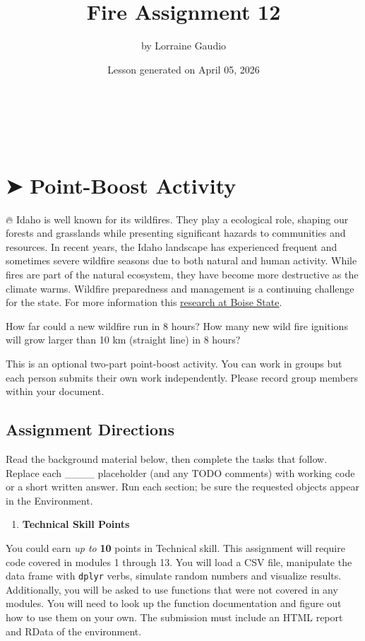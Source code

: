 \documentclass[
  12pt,
]{scrreprt}
\title{Fire Assignment 12}
\author{by Lorraine Gaudio}
\date{Lesson generated on April 05, 2026}
\providecommand{\tightlist}{%
  \setlength{\itemsep}{0pt}\setlength{\parskip}{0pt}}
\renewcommand{\maketitle}{
  \thispagestyle{titlepage}  %
  \begin{center}
    \vspace*{3cm}
    {\Huge\sffamily\bfseries\color{boisestateblue}\thetitle}\\[4cm]

    \vspace*{1cm}
    {\Large\sffamily\color{boisestateblue}\theauthor}\\[0.5cm]
    {\large\sffamily\color{boisestateblue}\thedate}
  \end{center}
  \clearpage
  \thispagestyle{empty}  %
  \pagenumbering{arabic}
  \setcounter{page}{1}
}
\begin{document}
\maketitle

{
\hypersetup{linkcolor=}
\setcounter{tocdepth}{1}
\tableofcontents
}
\chapter{➤ Point-Boost Activity}\label{point-boost-activity}

🔥 Idaho is well known for its wildfires. They play a ecological role, shaping our forests and grasslands while presenting significant hazards to communities and resources. In recent years, the Idaho landscape has experienced frequent and sometimes severe wildfire seasons due to both natural and human activity. While fires are part of the natural ecosystem, they have become more destructive as the climate warms. Wildfire preparedness and management is a continuing challenge for the state. For more information this \href{https://www.boisestate.edu/coas/2024/12/04/boise-state-experts-provide-perspective-on-idaho-mountain-wildfires/}{research at Boise State}.

How far could a new wildfire run in 8 hours? How many new wild fire ignitions will grow larger than 10 km (straight line) in 8 hours?

This is an optional two-part point-boost activity. You can work in groups but each person submits their own work independently. Please record group members within your document.

\section{Assignment Directions}\label{assignment-directions}

Read the background material below, then complete the tasks that follow. Replace each \_\_\_\_ placeholder (and any TODO comments) with working code or a short written answer. Run each section; be sure the requested objects appear in the Environment.

\begin{enumerate}
\def\labelenumi{\arabic{enumi}.}
\tightlist
\item
  \textbf{Technical Skill Points}
\end{enumerate}

You could earn \emph{up to} \textbf{10} points in Technical skill. This assignment will require code covered in modules 1 through 13. You will load a CSV file, manipulate the data frame with \texttt{dplyr} verbs, simulate random numbers and visualize results. Additionally, you will be asked to use functions that were not covered in any modules. You will need to look up the function documentation and figure out how to use them on your own. The submission must include an HTML report and RData of the environment.
\end{document}

